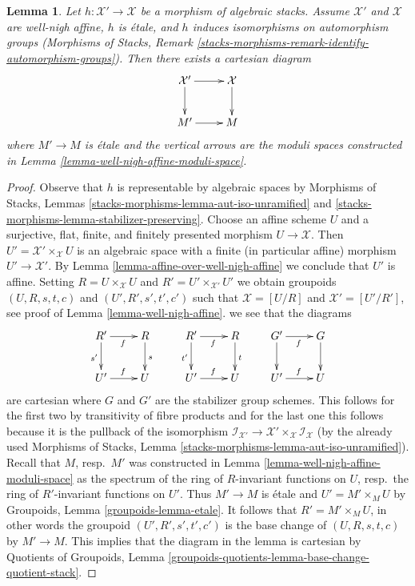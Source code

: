 \documentclass[10pt,a4paper]{amsart}
\theoremstyle{plain}
\newtheorem{lemma}[subsection]{Lemma}
\theoremstyle{definition}
\theoremstyle{remark}
\numberwithin{equation}{subsection}
\begin{document}
\begin{lemma}
\label{lemma-well-nigh-affine-moduli-space-etale}
Let $h : \mathcal{X}' \to \mathcal{X}$ be a morphism of algebraic stacks.
Assume $\mathcal{X}'$ and $\mathcal{X}$ are well-nigh affine,
$h$ is \'etale, and $h$ induces isomorphisms on automorphism groups
(Morphisms of Stacks, Remark
\ref{stacks-morphisms-remark-identify-automorphism-groups}).
Then there exists a cartesian diagram
$$
\xymatrix{
\mathcal{X}' \ar[d] \ar[r] & \mathcal{X} \ar[d] \\
M' \ar[r] & M
}
$$
where $M' \to M$ is \'etale and
the vertical arrows are the moduli spaces constructed in
Lemma \ref{lemma-well-nigh-affine-moduli-space}.
\end{lemma}

\begin{proof}
Observe that $h$ is representable by algebraic spaces by
Morphisms of Stacks, Lemmas
\ref{stacks-morphisms-lemma-aut-iso-unramified} and
\ref{stacks-morphisms-lemma-stabilizer-preserving}.
Choose an affine scheme $U$ and a
surjective, flat, finite, and finitely presented morphism $U \to \mathcal{X}$.
Then $U' = \mathcal{X}' \times_\mathcal{X} U$ is an algebraic
space with a finite (in particular affine) morphism $U' \to \mathcal{X}'$.
By Lemma \ref{lemma-affine-over-well-nigh-affine}
we conclude that $U'$ is affine.
Setting $R = U \times_\mathcal{X} U$ and $R' = U' \times_{\mathcal{X}'} U'$
we obtain groupoids $(U, R, s, t, c)$ and $(U', R', s', t', c')$
such that $\mathcal{X} = [U/R]$ and $\mathcal{X}' = [U'/R']$,
see proof of Lemma \ref{lemma-well-nigh-affine}.
we see that the diagrams
$$
\xymatrix{
R' \ar[d]_{s'} \ar[r]_f & R \ar[d]^s \\
U' \ar[r]^f & U
}
\quad
\quad
\xymatrix{
R' \ar[d]_{t'} \ar[r]_f & R \ar[d]^t \\
U' \ar[r]^f & U
}
\quad
\quad
\xymatrix{
G' \ar[d] \ar[r]_f & G \ar[d] \\
U' \ar[r]^f & U
}
$$
are cartesian where $G$ and $G'$ are the stabilizer group schemes.
This follows for the first two by transitivity of fibre products
and for the last one this follows because it is the pullback of the
isomorphism $\mathcal{I}_{\mathcal{X}'} \to
\mathcal{X}' \times_\mathcal{X} \mathcal{I}_\mathcal{X}$
(by the already used Morphisms of Stacks, Lemma
\ref{stacks-morphisms-lemma-aut-iso-unramified}).
Recall that $M$, resp.\ $M'$ was constructed in
Lemma \ref{lemma-well-nigh-affine-moduli-space}
as the spectrum of the ring of $R$-invariant functions on $U$,
resp.\ the ring of $R'$-invariant functions on $U'$.
Thus $M' \to M$ is \'etale and $U' = M' \times_M U$
by Groupoids, Lemma \ref{groupoids-lemma-etale}.
It follows that $R' = M' \times_M U$, in other words
the groupoid $(U', R', s', t', c')$ is the base change of
$(U, R, s, t, c)$ by $M' \to M$.
This implies that the diagram in the lemma is
cartesian by
Quotients of Groupoids, Lemma
\ref{groupoids-quotients-lemma-base-change-quotient-stack}.
\end{proof}
\end{document}

